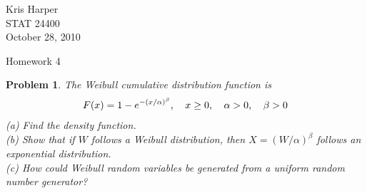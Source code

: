\documentclass{article}
\newtheorem{problem}{Problem}
\begin{document}
\begin{flushright}
Kris Harper\\

STAT 24400\\

October 28, 2010
\end{flushright}

\begin{center}
Homework 4
\end{center}

\begin{problem}
The \emph{Weibull} cumulative distribution function is
\[
\begin{tabular}{cccc}
$\displaystyle{F(x) = 1 - e^{-(x/\alpha)^{\beta}}}$, & $\displaystyle{x \geq 0}$, & $\displaystyle{\alpha > 0}$, & $\displaystyle{\beta > 0}$
\end{tabular}
\]
(a) Find the density function.\\
(b) Show that if $W$ follows a Weibull distribution, then $X = (W/\alpha)^{\beta}$ follows an exponential distribution.\\
(c) How could Weibull random variables be generated from a uniform random number generator?
\end{problem}
\end{document}
